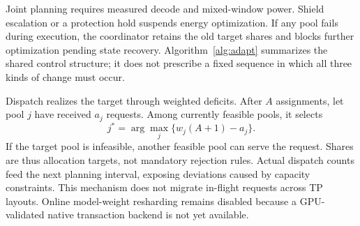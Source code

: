 \documentclass[11pt,a4paper,twocolumn]{article}
\begin{document}
Joint planning requires measured decode and mixed-window
power. Shield escalation or a protection hold suspends
energy optimization. If any pool fails during execution,
the coordinator retains the old target shares and blocks
further optimization pending state recovery.
Algorithm~\ref{alg:adapt} summarizes the shared control
structure; it does not prescribe a fixed sequence in which
all three kinds of change must occur.

Dispatch realizes the target through weighted deficits.
After $A$ assignments, let pool $j$ have received $a_j$
requests. Among currently feasible pools, it selects
\begin{equation}
j^*=\arg\max_j\{w_j(A+1)-a_j\}.
\end{equation}
If the target pool is infeasible, another feasible pool
can serve the request. Shares are thus allocation targets,
not mandatory rejection rules. Actual dispatch counts feed
the next planning interval, exposing deviations caused by
capacity constraints. This mechanism does not migrate
in-flight requests across TP layouts. Online model-weight
resharding remains disabled because a GPU-validated native
transaction backend is not yet available.
\end{document}
